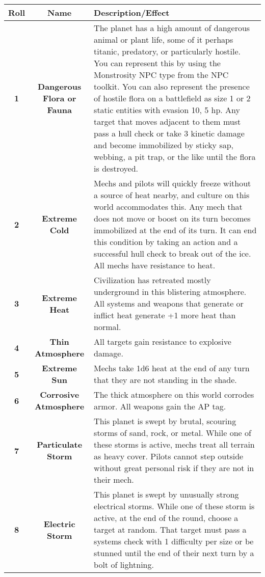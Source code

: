 \begin{longtable}{|c|c|p{10cm}|} 
    \hline
    \textbf{Roll} & \textbf{Name} & \textbf{Description/Effect} \\ \hline
    \textbf{1} & \textbf{Dangerous Flora or Fauna} & The planet has a high amount of dangerous animal or plant life, some of it perhaps titanic, predatory, or particularly hostile. You can represent this by using the Monstrosity NPC type from the NPC toolkit. You can also represent the presence of hostile flora on a battlefield as size 1 or 2 static entities with evasion 10, 5 hp. Any target that moves adjacent to them must pass a hull check or take 3 kinetic damage and become immobilized by sticky sap, webbing, a pit trap, or the like until the flora is destroyed.\\ \hline
    \textbf{2} & \textbf{Extreme Cold} & Mechs and pilots will quickly freeze without a source of heat nearby, and culture on this world accommodates this. Any mech that does not move or boost on its turn becomes immobilized at the end of its turn. It can end this condition by taking an action and a successful hull check to break out of the ice. All mechs have resistance to heat. \\\hline
    \textbf{3} & \textbf{Extreme Heat} & Civilization has retreated mostly underground in this blistering atmosphere. All systems and weapons that generate or inflict heat generate +1 more heat than normal.\\\hline
    \textbf{4} & \textbf{Thin Atmosphere} &  All targets gain resistance to explosive damage.\\ \hline
    \textbf{5} & \textbf{Extreme Sun} & Mechs take 1d6 heat at the end of any turn that they are not standing in the shade.\\ \hline
    \textbf{6} & \textbf{Corrosive Atmosphere} & The thick atmosphere on this world corrodes armor. All weapons gain the AP tag.\\ \hline
    \textbf{7} & \textbf{Particulate Storm} & This planet is swept by brutal, scouring storms of sand, rock, or metal. While one of these storms is active, mechs treat all terrain as heavy cover. Pilots cannot step outside without great personal risk if they are not in their mech.\\ \hline
    \textbf{8} & \textbf{Electric Storm} & This planet is swept by unusually strong electrical storms. While one of these storm is active, at the end of the round, choose a target at random. That target must pass a systems check with 1 difficulty per size or be stunned until the end of their next turn by a bolt of lightning.\\ \hline

\end{longtable}
